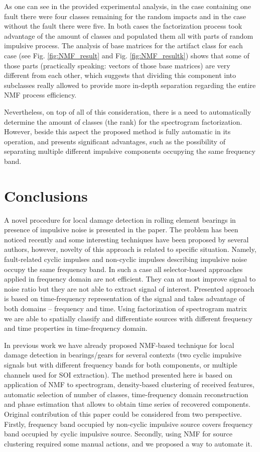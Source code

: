 \documentclass[3p,times]{elsarticle}
\begin{document}
As one can see in the provided experimental analysis, in the case containing one fault there were four classes remaining for the random impacts and in the case without the fault there were five. In both cases the factorization process took advantage of the amount of classes and populated them all with parts of random impulsive process. The analysis of base matrices for the artifact class for each case (see Fig. \ref{fig:NMF_result} and Fig. \ref{fig:NMF_resultk}) shows that some of those parts (practically speaking: vectors of those base matrices) are very different from each other, which suggests that dividing this component into subclasses really allowed to provide more in-depth separation regarding the entire NMF process efficiency. 

Nevertheless, on top of all of this consideration, there is a need to automatically determine the amount of classes (the rank) for the spectrogram factorization. However, beside this aspect the proposed method is fully automatic in its operation, and presents
significant advantages, such as the possibility of separating multiple different impulsive components occupying the same frequency band.

\section{Conclusions}

A novel procedure for local damage detection in rolling element bearings in presence of impulsive noise is presented in the paper. The problem has been noticed recently and some interesting techniques have been proposed by several authors, however, novelty of this approach is related to specific situation. Namely, fault-related cyclic impulses and non-cyclic impulses describing impulsive noise occupy the same frequency band. In such a case all selector-based approaches applied in frequency domain are not efficient. They can at most improve signal to noise ratio but they are not able to extract signal of interest. Presented approach is based on time-frequency representation of the signal and takes advantage of both domains -- frequency and time. Using factorization of spectrogram matrix we are able to spatially classify and differentiate sources with different frequency and time properties in time-frequency domain.

In previous work we have already proposed NMF-based technique for local damage detection in bearings/gears for several contexts (two cyclic impulsive signals but with different frequency bands for both components, or multiple channels used for SOI extraction). The method presented here is based on application of NMF to spectrogram, density-based clustering of received features, automatic selection of number of classes, time-frequency domain reconstruction and phase estimation that allows to obtain time series of recovered components. Original contribution of this paper could be considered from two perspective. Firstly, frequency band occupied by non-cyclic impulsive source covers frequency band occupied by cyclic impulsive source. Secondly, using NMF for source clustering required some manual actions, and we proposed a way to automate it.
\end{document}
